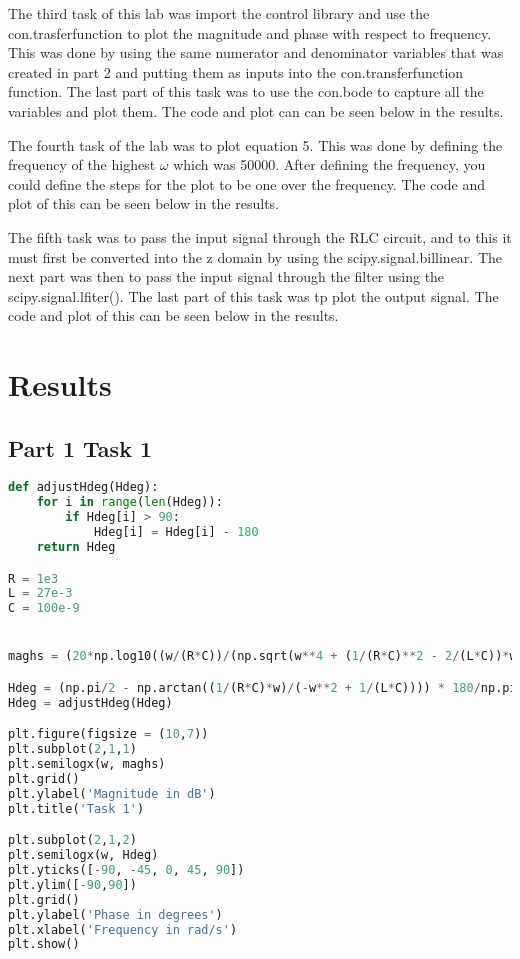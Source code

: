 \documentclass[11pt,a4]{report}
\begin{document}
The third task of this lab was import the control library and use the con.trasferfunction to plot the magnitude and phase with respect to frequency. This was done by using the same numerator and denominator variables that was created in part 2 and putting them as inputs into the con.transferfunction function. The last part of this task was to use the con.bode to capture all the variables and plot them. The code and plot can can be seen below in the results. 

The fourth task of the lab was to plot equation 5. This was done by defining the frequency of the highest $\omega$ which was 50000. After defining the frequency, you could define the steps for the plot to be one over the frequency. The code and plot of this can be seen below in the results.

The fifth task was to pass the input signal through the RLC circuit, and to this it must first be converted into the z domain by using the scipy.signal.billinear. The next part was then to pass the input signal through the filter using the scipy.signal.lfiter(). The last part of this task was tp plot the output signal. The code and plot of this can be seen below in the results.

\section{Results}
\subsection{Part 1 Task 1}

\begin{lstlisting}[language=Python]
def adjustHdeg(Hdeg):
    for i in range(len(Hdeg)):
        if Hdeg[i] > 90:
            Hdeg[i] = Hdeg[i] - 180
    return Hdeg

R = 1e3
L = 27e-3
C = 100e-9


maghs = (20*np.log10((w/(R*C))/(np.sqrt(w**4 + (1/(R*C)**2 - 2/(L*C))*w**2 + (1/(L*C))**2))))

Hdeg = (np.pi/2 - np.arctan((1/(R*C)*w)/(-w**2 + 1/(L*C)))) * 180/np.pi
Hdeg = adjustHdeg(Hdeg)

plt.figure(figsize = (10,7))
plt.subplot(2,1,1)
plt.semilogx(w, maghs)
plt.grid()
plt.ylabel('Magnitude in dB')
plt.title('Task 1')

plt.subplot(2,1,2)
plt.semilogx(w, Hdeg)
plt.yticks([-90, -45, 0, 45, 90])
plt.ylim([-90,90])
plt.grid()
plt.ylabel('Phase in degrees')
plt.xlabel('Frequency in rad/s')
plt.show()

\end{lstlisting}
\end{document}
